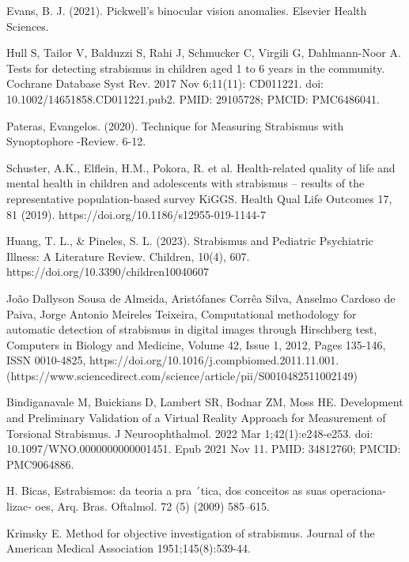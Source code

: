 \documentclass{article}
\begin{document}
\begin{thebibliography}{99}

Evans, B. J. (2021). Pickwell's binocular vision anomalies. Elsevier Health Sciences.

Hull S, Tailor V, Balduzzi S, Rahi J, Schmucker C, Virgili G, Dahlmann-Noor A. Tests for detecting strabismus in children aged 1 to 6 years in the community. Cochrane Database Syst Rev. 2017 Nov 6;11(11): CD011221. doi: 10.1002/14651858.CD011221.pub2. PMID: 29105728; PMCID: PMC6486041.

Pateras, Evangelos. (2020). Technique for Measuring Strabismus with Synoptophore -Review. 6-12. 

Schuster, A.K., Elflein, H.M., Pokora, R. et al. Health-related quality of life and mental health in children and adolescents with strabismus – results of the representative population-based survey KiGGS. Health Qual Life Outcomes 17, 81 (2019). https://doi.org/10.1186/s12955-019-1144-7


Huang, T. L., \& Pineles, S. L. (2023). Strabismus and Pediatric Psychiatric Illness: A Literature Review. Children, 10(4), 607. https://doi.org/10.3390/children10040607

João Dallyson Sousa de Almeida, Aristófanes Corrêa Silva, Anselmo Cardoso de Paiva, Jorge Antonio Meireles Teixeira,
Computational methodology for automatic detection of strabismus in digital images through Hirschberg test,
Computers in Biology and Medicine,
Volume 42, Issue 1,
2012,
Pages 135-146,
ISSN 0010-4825,
https://doi.org/10.1016/j.compbiomed.2011.11.001.
(https://www.sciencedirect.com/science/article/pii/S0010482511002149)

Bindiganavale M, Buickians D, Lambert SR, Bodnar ZM, Moss HE. Development and Preliminary Validation of a Virtual Reality Approach for Measurement of Torsional Strabismus. J Neuroophthalmol. 2022 Mar 1;42(1):e248-e253. doi: 10.1097/WNO.0000000000001451. Epub 2021 Nov 11. PMID: 34812760; PMCID: PMC9064886.

H. Bicas, Estrabismos: da teoria a pra  ´tica, dos conceitos as suas operaciona-
lizac- oes, Arq. Bras. Oftalmol. 72 (5) (2009) 585–615.


Krimsky E. Method for objective investigation of strabismus.
Journal of the American Medical Association 1951;145(8):539-44.


\end{thebibliography}
\end{document}
